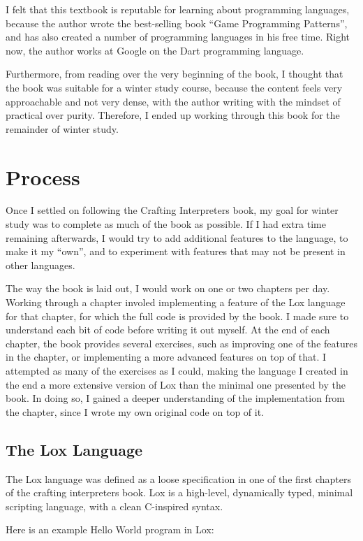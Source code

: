 \documentclass[tikz]{article}
\renewcommand{\:}{\colon}
\begin{document}
I felt that this textbook is reputable for learning about programming languages, because the author wrote the best-selling book ``Game Programming Patterns'', and has also created a number of programming languages in his free time. Right now, the author works at Google on the Dart programming language.

Furthermore, from reading over the very beginning of the book, I thought that the book was suitable for a winter study course, because the content feels very approachable and not very dense, with the author writing with the mindset of practical over purity. Therefore, I ended up working through this book for the remainder of winter study.

\section*{Process}
Once I settled on following the Crafting Interpreters book, my goal for winter study was to complete as much of the book as possible. If I had extra time remaining afterwards, I would try to add additional features to the language, to make it my ``own'', and to experiment with features that may not be present in other languages.

The way the book is laid out, I would work on one or two chapters per day. Working through a chapter involed implementing a feature of the Lox language for that chapter, for which the full code is provided by the book. I made sure to understand each bit of code before writing it out myself. At the end of each chapter, the book provides several exercises, such as improving one of the features in the chapter, or implementing a more advanced features on top of that. I attempted as many of the exercises as I could, making the language I created in the end a more extensive version of Lox than the minimal one presented by the book. In doing so, I gained a deeper understanding of the implementation from the chapter, since I wrote my own original code on top of it.

\subsection*{The Lox Language}
The Lox language was defined as a loose specification in one of the first chapters of the crafting interpreters book. Lox is a high-level, dynamically typed, minimal scripting language, with a clean C-inspired syntax.

Here is an example Hello World program in Lox:
\end{document}
